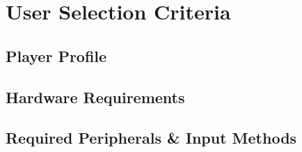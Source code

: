 



\section{User Selection Criteria}

\subsection{Player Profile}


\subsection{Hardware Requirements}


\subsection{Required Peripherals \& Input Methods}


